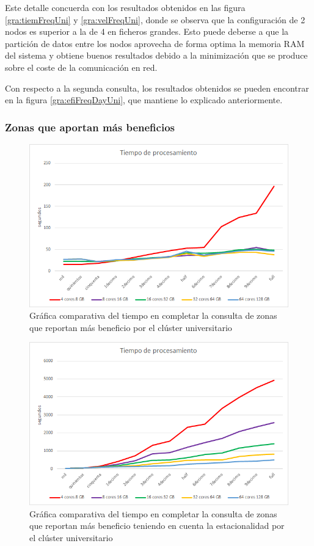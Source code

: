 Este detalle concuerda con los resultados obtenidos en las figura \ref{gra:tiemFreqUni} y \ref{gra:velFreqUni}, donde se observa que la configuración de 2 nodos es superior a la de 4 en ficheros grandes. Esto puede deberse a que la partición de datos entre los nodos aprovecha de forma optima la memoria \gls{RAM} del sistema y obtiene buenos resultados debido a la minimización que se produce sobre el coste de la comunicación en red.

Con respecto a la segunda consulta, los resultados obtenidos se pueden encontrar en la figura \ref{gra:efiFreqDayUni}, que mantiene lo explicado anteriormente.

\subsubsection{Zonas que aportan más beneficios}
\begin{figure}[htp!]
	\centering
	\caption{Gráfica comparativa del tiempo en completar la consulta de zonas que reportan más beneficio por el clúster universitario}
	\label{gra:tiemProUni}
	\vspace{5pt}
	\includegraphics[scale=0.85]{graficas/tbuni}
\end{figure}
\begin{figure}[htp!]
	\centering
	\caption{Gráfica comparativa del tiempo en completar la consulta de zonas que reportan más beneficio teniendo en cuenta la estacionalidad por el clúster universitario}
	\label{gra:tiemProDayUni}
	\vspace{5pt}
	\includegraphics[scale=0.85]{graficas/tbduni}
\end{figure}
